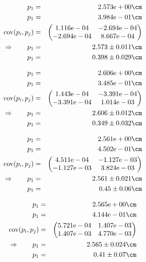 \begin{eqnarray}
    p_1 &=& 2.573\mathrm{e}+00 \cm \nonumber \\
    p_1 &=& 3.984\mathrm{e}-01 \cm \nonumber \\
    \mathrm{cov}(p_i, p_j) &=& 
    \begin{pmatrix}
        1.116\mathrm{e}-04 &-2.694\mathrm{e}-04 \\
        -2.694\mathrm{e}-04 &8.667\mathrm{e}-04 \\
    \end{pmatrix}
\\ \Rightarrow \qquad
    p_1 &=& 2.573 \pm 0.011 \cm\\
    p_1 &=& 0.398 \pm 0.029 \cm
\end{eqnarray}

\begin{eqnarray}
    p_1 &=& 2.606\mathrm{e}+00 \cm \nonumber \\
    p_1 &=& 3.485\mathrm{e}-01 \cm \nonumber \\
    \mathrm{cov}(p_i, p_j) &=& 
    \begin{pmatrix}
        1.443\mathrm{e}-04 &-3.391\mathrm{e}-04 \\
        -3.391\mathrm{e}-04 &1.014\mathrm{e}-03 \\
    \end{pmatrix}
\\ \Rightarrow \qquad
    p_1 &=& 2.606 \pm 0.012 \cm\\
    p_1 &=& 0.349 \pm 0.032 \cm
\end{eqnarray}

\begin{eqnarray}
    p_1 &=& 2.561\mathrm{e}+00 \cm \nonumber \\
    p_1 &=& 4.502\mathrm{e}-01 \cm \nonumber \\
    \mathrm{cov}(p_i, p_j) &=& 
    \begin{pmatrix}
        4.511\mathrm{e}-04 &-1.127\mathrm{e}-03 \\
        -1.127\mathrm{e}-03 &3.824\mathrm{e}-03 \\
    \end{pmatrix}
\\ \Rightarrow \qquad
    p_1 &=& 2.561 \pm 0.021 \cm\\
    p_1 &=& 0.45 \pm 0.06 \cm
\end{eqnarray}

\begin{eqnarray}
    p_1 &=& 2.565\mathrm{e}+00 \cm \nonumber \\
    p_1 &=& 4.144\mathrm{e}-01 \cm \nonumber \\
    \mathrm{cov}(p_i, p_j) &=& 
    \begin{pmatrix}
        5.721\mathrm{e}-04 &1.407\mathrm{e}-03 \\
        1.407\mathrm{e}-03 &4.770\mathrm{e}-03 \\
    \end{pmatrix}
\\ \Rightarrow \qquad
    p_1 &=& 2.565 \pm 0.024 \cm\\
    p_1 &=& 0.41 \pm 0.07 \cm
\end{eqnarray}

